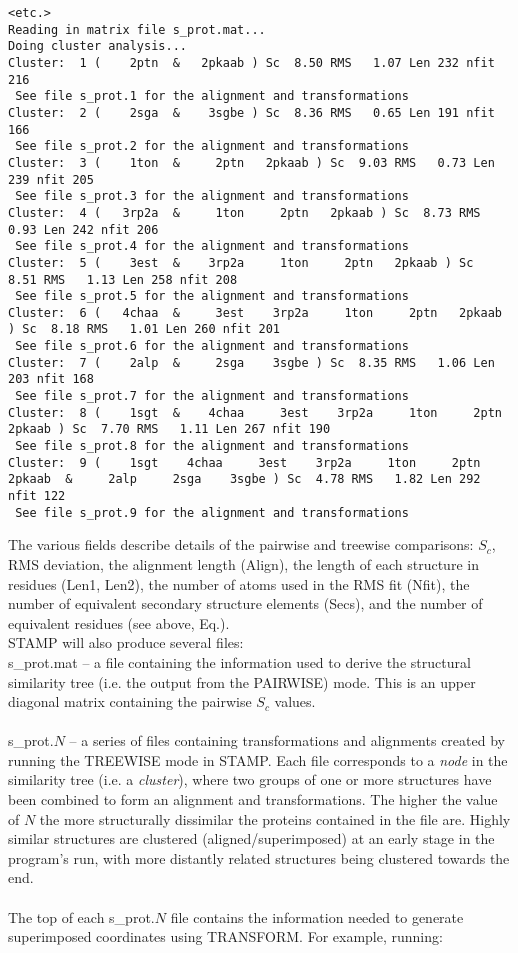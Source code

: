 \begin{scriptsize}
\begin{verbatim}
<etc.>
Reading in matrix file s_prot.mat...
Doing cluster analysis...
Cluster:  1 (    2ptn  &   2pkaab ) Sc  8.50 RMS   1.07 Len 232 nfit 216
 See file s_prot.1 for the alignment and transformations
Cluster:  2 (    2sga  &    3sgbe ) Sc  8.36 RMS   0.65 Len 191 nfit 166
 See file s_prot.2 for the alignment and transformations
Cluster:  3 (    1ton  &     2ptn   2pkaab ) Sc  9.03 RMS   0.73 Len 239 nfit 205
 See file s_prot.3 for the alignment and transformations
Cluster:  4 (   3rp2a  &     1ton     2ptn   2pkaab ) Sc  8.73 RMS   0.93 Len 242 nfit 206
 See file s_prot.4 for the alignment and transformations
Cluster:  5 (    3est  &    3rp2a     1ton     2ptn   2pkaab ) Sc  8.51 RMS   1.13 Len 258 nfit 208
 See file s_prot.5 for the alignment and transformations
Cluster:  6 (   4chaa  &     3est    3rp2a     1ton     2ptn   2pkaab ) Sc  8.18 RMS   1.01 Len 260 nfit 201
 See file s_prot.6 for the alignment and transformations
Cluster:  7 (    2alp  &     2sga    3sgbe ) Sc  8.35 RMS   1.06 Len 203 nfit 168
 See file s_prot.7 for the alignment and transformations
Cluster:  8 (    1sgt  &    4chaa     3est    3rp2a     1ton     2ptn   2pkaab ) Sc  7.70 RMS   1.11 Len 267 nfit 190
 See file s_prot.8 for the alignment and transformations
Cluster:  9 (    1sgt    4chaa     3est    3rp2a     1ton     2ptn   2pkaab  &     2alp     2sga    3sgbe ) Sc  4.78 RMS   1.82 Len 292 nfit 122
 See file s_prot.9 for the alignment and transformations
\end{verbatim} \end{scriptsize}

The various fields describe details of the pairwise and treewise
comparisons: $S_{c}$, RMS deviation, the alignment length (Align),
the length of each structure in residues (Len1, Len2), the number of
atoms used in the RMS fit (Nfit), the number of equivalent secondary
structure elements (Secs), and the number of equivalent residues
(see above, Eq.).\\

STAMP will also produce several files: \\

s\_prot.mat -- a file containing the information used to derive the 
structural similarity tree (i.e. the output from the PAIRWISE) mode.  This
is an upper diagonal matrix containing the pairwise $S_{c}$ values.\\
\\
s\_prot.$N$ -- a series of files containing transformations and alignments 
created by running the TREEWISE mode in STAMP.  Each file corresponds to 
a {\em node} in the similarity tree (i.e. a {\em cluster}), where two 
groups of one or more structures have been combined to form an
alignment and transformations.  The higher the value of $N$ the more 
structurally dissimilar the proteins contained in the file are.  Highly 
similar structures are clustered (aligned/superimposed) at an early stage 
in the program's run, with more distantly related structures being clustered 
towards the end.\\
\\
The top of each s\_prot.$N$ file contains the information needed to generate 
superimposed coordinates using TRANSFORM. For example, running:

